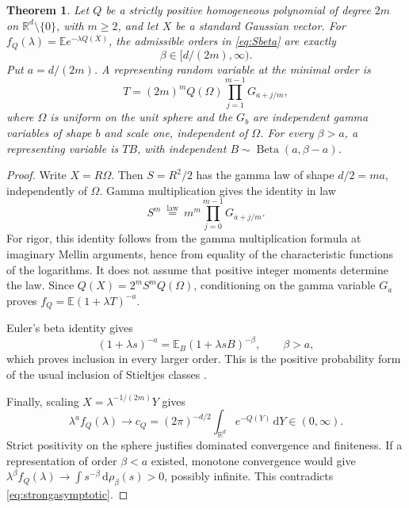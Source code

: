 \documentclass[11pt]{article}
\newtheorem{theorem}{Theorem}[section]
\theoremstyle{definition}
\newcommand{\E}{\mathbb E}
\newcommand{\dd}{\,\mathrm d}
\numberwithin{equation}{section}
\begin{document}
\begin{theorem}\label{thm:exactorder}
Let $Q$ be a strictly positive homogeneous polynomial of degree $2m$ on
$\mathbb R^d\setminus\{0\}$, with $m\ge2$, and let $X$ be a standard
Gaussian vector. For
$f_Q(\lambda)=\E e^{-\lambda Q(X)}$, the admissible orders in
\eqref{eq:Sbeta} are exactly
\[
 \beta\in[d/(2m),\infty).
\]
Put $a=d/(2m)$. A representing random variable at the minimal order is
\begin{equation}\label{eq:rho}
 T=(2m)^m Q(\Omega)\prod_{j=1}^{m-1}G_{a+j/m},
\end{equation}
where $\Omega$ is uniform on the unit sphere and the $G_b$ are
independent gamma variables of shape $b$ and scale one, independent of
$\Omega$. For every $\beta>a$, a representing variable is
$T B$, with independent $B\sim\operatorname{Beta}(a,\beta-a)$.
\end{theorem}
\begin{proof}
Write $X=R\Omega$. Then $S=R^2/2$ has the gamma law of shape $d/2=ma$,
independently of $\Omega$. Gamma multiplication gives the identity in law
\begin{equation}\label{eq:gammaproduct}
 S^m\ \stackrel{\mathrm{law}}=\ m^m\prod_{j=0}^{m-1}G_{a+j/m}.
\end{equation}
For rigor, this identity follows from the gamma multiplication formula
at imaginary Mellin arguments, hence from equality of the characteristic
functions of the logarithms. It does not assume that positive integer
moments determine the law. Since
$Q(X)=2^m S^m Q(\Omega)$, conditioning on the gamma variable $G_a$
proves $f_Q=\E(1+\lambda T)^{-a}$.

Euler's beta identity gives
\begin{equation}\label{eq:betainclusion}
 (1+\lambda s)^{-a}
   =\E_B(1+\lambda sB)^{-\beta},\qquad \beta>a,
\end{equation}
which proves inclusion in every larger order. This is the positive
probability form of the usual inclusion of Stieltjes classes
\cite[Theorem 3]{KarpPrilepkina}.

Finally, scaling $X=\lambda^{-1/(2m)}Y$ gives
\begin{equation}\label{eq:strongasymptotic}
 \lambda^a f_Q(\lambda)\longrightarrow
 c_Q=(2\pi)^{-d/2}\int_{\mathbb R^d}e^{-Q(Y)}\dd Y\in(0,\infty).
\end{equation}
Strict positivity on the sphere justifies dominated convergence and
finiteness. If a representation of order $\beta<a$ existed, monotone
convergence would give
$\lambda^\beta f_Q(\lambda)\to\int s^{-\beta}\dd\rho_\beta(s)>0$,
possibly infinite. This contradicts \eqref{eq:strongasymptotic}.
\end{proof}
\end{document}
